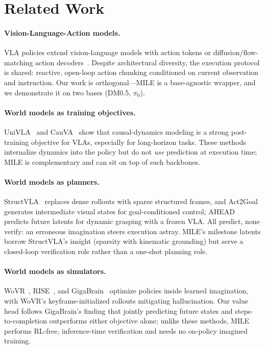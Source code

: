 \documentclass{article}
\newcommand{\mile}{\textsc{MILE}}
\begin{document}
\section{Related Work}
\label{sec:related}

\paragraph{Vision-Language-Action models.}
VLA policies extend vision-language models with action tokens or diffusion/flow-matching action decoders~\cite{rt2,openvla,pi0,univla,groot,dm05}. Despite architectural diversity, the execution protocol is shared: reactive, open-loop action chunking conditioned on current observation and instruction. Our work is orthogonal---\mile{} is a base-agnostic wrapper, and we demonstrate it on two bases (DM0.5, $\pi_0$).

\paragraph{World models as training objectives.}
UniVLA~\cite{univla} and CauVA~\cite{cauva} show that causal-dynamics modeling is a strong post-training objective for VLAs, especially for long-horizon tasks. These methods internalize dynamics into the policy but do not \emph{use} prediction at execution time; \mile{} is complementary and can sit on top of such backbones.

\paragraph{World models as planners.}
StructVLA~\cite{structvla} replaces dense rollouts with sparse structured frames, and Act2Goal~\cite{act2goal} generates intermediate visual states for goal-conditioned control; AHEAD~\cite{ahead} predicts future latents for dynamic grasping with a frozen VLA. All predict, none verify: an erroneous imagination steers execution astray. \mile{}'s milestone latents borrow StructVLA's insight (sparsity with kinematic grounding) but serve a closed-loop verification role rather than a one-shot planning role.

\paragraph{World models as simulators.}
WoVR~\cite{wovr}, RISE~\cite{rise}, and GigaBrain~\cite{gigabrain} optimize policies inside learned imagination, with WoVR's keyframe-initialized rollouts mitigating hallucination. Our value head follows GigaBrain's finding that jointly predicting future states and steps-to-completion outperforms either objective alone; unlike these methods, \mile{} performs RL-free, inference-time verification and needs no on-policy imagined training.
\end{document}
